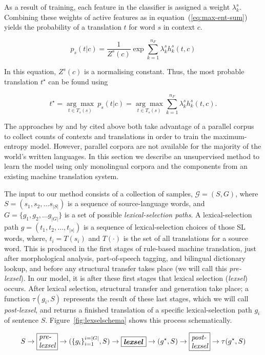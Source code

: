 \documentclass[11pt]{article}
\begin{document}
As a result of training, each feature in the classifier is assigned a
weight $\lambda_k^s$. Combining these weights of active features
as in equation~(\ref{eq:max-ent-sum}) yields the probability of a
translation $t$ for word $s$ in context $c$.

\begin{equation}
p_s(t|c) = \frac{1}{Z^s(c)} \exp{ \sum_{k=1}^{n_F} \lambda_k^s h_k^s(t, c)}
\label{eq:max-ent-sum}
\end{equation}

In this equation, $Z^s(c)$ is a normalising constant. Thus, the most
probable translation \(t^\star\) can be found using

\begin{equation}
  t^\star=\underset{t \in T_s(s)}{\arg\max} ~ p_s(t|c) = \underset{t \in T_s(s)}{\arg\max} \sum_{k=1}^{n_F} \lambda_k^s h_k^s(t, c) .
\label{eq:max-ent-max}
\end{equation}


The approaches by \cite{berger1996} and by \cite{marechek10} cited
above both take advantage of a parallel corpus to collect counts of
contexts and translations in order to train the maximum-entropy
model. However, parallel corpora are not available for the majority of
the world's written languages. In this section we describe an
unsupervised method to learn the model using only monolingual corpora
and the components from an existing machine translation system.

The input to our method consists of a collection of samples,
$\mathcal{G} = (S, G)$, where $S = (s_1, s_2, \ldots s_{|S|})$ is a
sequence of source-language words, and $G = \{g_1, g_2, \ldots
g_{|G|}\}$ is a set of possible \emph{lexical-selection paths}. A
lexical-selection path $g = (t_1, t_2, \ldots, t_{|s|})$ is a sequence
of lexical-selection choices of those SL words, where, \(t_i=T(s_i)\)
and \(T(\cdot)\) is the set of all translations for a source
word. This is produced in the first stages of rule-based machine
translation, just after morphological analysis, part-of-speech
tagging, and bilingual dictionary lookup, and before any structural
transfer takes place (we will call this \emph{pre-lexsel}). In our
model, it is after these first stages that lexical selection
(\emph{lexsel}) occurs. After lexical selection, structural transfer
and generation take place; a function $\tau(g_i,S)$ represents the
result of these last stages, which we will call \emph{post-lexsel},
and returns a finished translation of a specific lexical-selection
path $g_i$ of sentence $S$. Figure~\ref{fig:lexselschema} shows
 this process schematically.
\begin{figure*}
\begin{displaymath}
  \label{eq:steps}
  S \to \mbox{\framebox{\parbox{0.8cm}{\textit{pre- lexsel}}}} \to (\{g_i\}_{i=1}^{i=|G|},S) \to \mbox{\framebox{\parbox{1.0cm}{\textit{\textbf{lexsel}}}}} \to (g^\star,S) \to \mbox{\framebox{\parbox{0.8cm}{\textit{post- lexsel}}}} \to \tau(g^\star,S)
\end{displaymath}
 \caption{A schema of the training process}
 \label{fig:lexselschema}
\end{figure*}
\end{document}
